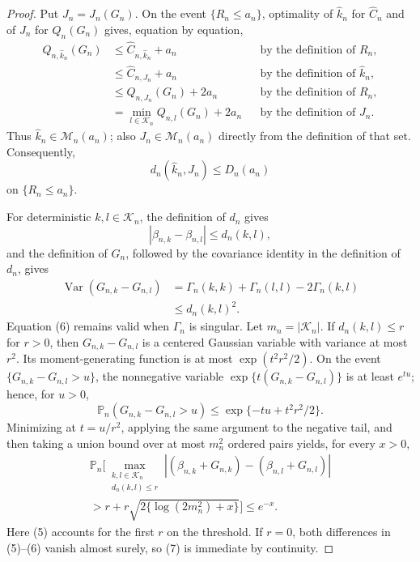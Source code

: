 \documentclass{article}
\begin{document}
\begin{proof}
Put \(J_n=J_n(G_n)\).  On the event \(\{R_n\leq a_n\}\), optimality of \(\widehat k_n\) for \(\widehat C_n\) and of \(J_n\) for \(Q_n(G_n)\) gives, equation by equation,
\[
 \begin{aligned}
 Q_{n,\widehat k_n}(G_n)
 &\leq \widehat C_{n,\widehat k_n}+a_n
 &&\text{by the definition of \(R_n\)},\\
 &\leq \widehat C_{n,J_n}+a_n
 &&\text{by the definition of \(\widehat k_n\)},\\
 &\leq Q_{n,J_n}(G_n)+2a_n
 &&\text{by the definition of \(R_n\)},\\
 &=\min_{l\in\mathcal K_n}Q_{n,l}(G_n)+2a_n
 &&\text{by the definition of \(J_n\)}.
 \end{aligned} \tag{3}
\]
Thus \(\widehat k_n\in\mathcal M_n(a_n)\); also \(J_n\in\mathcal M_n(a_n)\) directly from the definition of that set.  Consequently,
\[
 d_n(\widehat k_n,J_n)\leq D_n(a_n) \tag{4}
\]
on \(\{R_n\leq a_n\}\).

For deterministic \(k,l\in\mathcal K_n\), the definition of \(d_n\) gives
\[
 |\beta_{n,k}-\beta_{n,l}|\leq d_n(k,l), \tag{5}
\]
and the definition of \(G_n\), followed by the covariance identity in the definition of \(d_n\), gives
\[
 \begin{aligned}
 \operatorname{Var}(G_{n,k}-G_{n,l})
 &=\Gamma_n(k,k)+\Gamma_n(l,l)-2\Gamma_n(k,l)\\
 &\leq d_n(k,l)^2. 
 \end{aligned} \tag{6}
\]
Equation (6) remains valid when \(\Gamma_n\) is singular.  Let \(m_n=|\mathcal K_n|\).  If \(d_n(k,l)\leq r\) for \(r>0\), then \(G_{n,k}-G_{n,l}\) is a centered Gaussian variable with variance at most \(r^2\).  Its moment-generating function is at most \(\exp(t^2r^2/2)\).  On the event \(\{G_{n,k}-G_{n,l}>u\}\), the nonnegative variable \(\exp\{t(G_{n,k}-G_{n,l})\}\) is at least \(e^{tu}\); hence, for \(u>0\),
\[
 \mathbb P_n(G_{n,k}-G_{n,l}>u)
 \leq \exp\{-tu+t^2r^2/2\}.
\]
Minimizing at \(t=u/r^2\), applying the same argument to the negative tail, and then taking a union bound over at most \(m_n^2\) ordered pairs yields, for every \(x>0\),
\[
 \begin{split}
 \mathbb P_n\Bigg[
 \max_{\substack{k,l\in\mathcal K_n\\d_n(k,l)\leq r}}
 |(\beta_{n,k}+G_{n,k})-(\beta_{n,l}+G_{n,l})|\\
 >r+r\sqrt{2\{\log(2m_n^2)+x\}}
 \Bigg]\leq e^{-x}. 
 \end{split} \tag{7}
\]
Here (5) accounts for the first \(r\) on the threshold.  If \(r=0\), both differences in (5)--(6) vanish almost surely, so (7) is immediate by continuity.


\end{proof}
\end{document}
